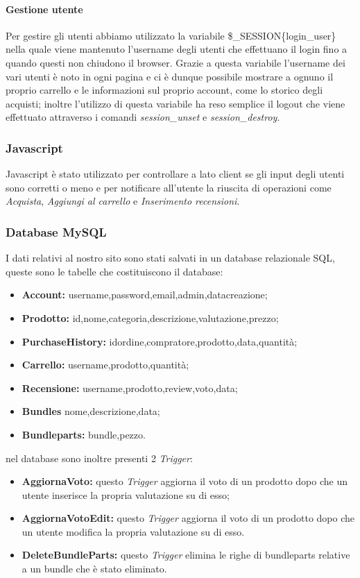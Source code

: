 \paragraph{Gestione utente} \Spazio
Per gestire gli utenti abbiamo utilizzato la variabile \$\_SESSION\{login\_user\} nella quale viene mantenuto l'username degli utenti che effettuano il login fino a quando questi non chiudono il browser.\newline
Grazie a questa variabile l'username dei vari utenti è noto in ogni pagina e ci è dunque possibile mostrare a ognuno il proprio carrello e le informazioni sul proprio account, come lo storico degli acquisti;
inoltre l'utilizzo di questa variabile ha reso semplice il logout che viene effettuato attraverso i comandi \emph{session\_unset} e \emph{session\_destroy}.

\subsubsection{Javascript}
Javascript è stato utilizzato per controllare a lato client se gli input degli utenti sono corretti o meno e per notificare all'utente la riuscita di operazioni come 
\emph{Acquista}, \emph{Aggiungi al carrello} e \emph{Inserimento recensioni}.

\subsubsection{Database MySQL}
I dati relativi al nostro sito sono stati salvati in un database relazionale SQL, queste sono le tabelle che costituiscono il database:
\begin{itemize}
    \item \textbf{Account:} username,password,email,admin,datacreazione;
    \item \textbf{Prodotto:} id,nome,categoria,descrizione,valutazione,prezzo;
    \item \textbf{PurchaseHistory:} idordine,compratore,prodotto,data,quantità;
    \item \textbf{Carrello:} username,prodotto,quantità;
    \item \textbf{Recensione:} username,prodotto,review,voto,data;
    \item \textbf{Bundles} nome,descrizione,data;
    \item \textbf{Bundleparts:} bundle,pezzo.	
\end{itemize}
nel database sono inoltre presenti 2 \emph{Trigger}:
\begin{itemize}
	\item \textbf{AggiornaVoto:} questo \emph{Trigger} aggiorna il voto di un prodotto dopo che un utente inserisce la propria valutazione su di esso;
	\item \textbf{AggiornaVotoEdit:} questo \emph{Trigger} aggiorna il voto di un prodotto dopo che un utente modifica la propria valutazione su di esso.
	\item \textbf{DeleteBundleParts:} questo \emph{Trigger} elimina le righe di bundleparts relative a un bundle che è stato eliminato.
\end{itemize}
